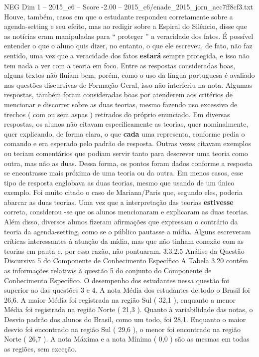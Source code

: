\begin{textsample}{NEG Dim 1 – 2015\_c6 – Score -2.00 – 2015\_c6/enade\_2015\_jorn\_aec7ff8cf3.txt}
Houve, também, casos em que o estudante respondeu corretamente sobre a agenda-setting e seu efeito, mas ao redigir sobre a Espiral do Silêncio, disse que as notícias eram manipuladas para “ proteger ” a veracidade dos fatos.
É possível entender o que o aluno quis dizer, no entanto, o que ele escreveu, de fato, não faz sentido, uma vez que a veracidade dos fatos \textbf{estará} sempre protegida, e isso não tem nada a ver com a teoria em foco.
Entre as respostas consideradas boas, alguns textos não fluíam bem, porém, como o uso da língua portuguesa é avaliado nas questões discursivas de Formação Geral, isso não interferiu na nota.
Algumas respostas, também foram consideradas boas por atenderem aos critérios de mencionar e discorrer sobre as duas teorias, mesmo fazendo uso excessivo de trechos ( com ou sem aspas ) retirados do próprio enunciado.
Em diversas respostas, os alunos não citavam especificamente as teorias, quer nominalmente, quer explicando, de forma clara, o que \textbf{cada} uma representa, conforme pedia o comando e era esperado pelo padrão de resposta.
Outras vezes citavam exemplos ou teciam comentários que podiam servir tanto para descrever uma teoria como outra, mas não as duas.
Dessa forma, os pontos foram dados conforme a resposta se encontrasse mais próxima de uma teoria ou da outra.
Em menos casos, esse tipo de resposta englobava as duas teorias, mesmo que usando de um único exemplo.
Foi muito citado o caso de Mariana/Paris que, segundo eles, poderia abarcar as duas teorias.
Uma vez que a interpretação das teorias \textbf{estivesse} correta, considerou -se que os alunos mencionaram e explicaram as duas teorias.
Além disso, diversos alunos fizeram afirmações que expressam o contrário da teoria da agenda-setting, como se o público pautasse a mídia.
Alguns escreveram críticas interessantes à atuação da mídia, mas que não tinham conexão com as teorias em pauta e, por essa razão, não pontuaram. 3.3.2.5 Análise da Questão Discursiva 5 do Componente de Conhecimento Específico A Tabela 3.20 contém as informações relativas à questão 5 do conjunto do Componente de Conhecimento Específico.
O desempenho dos estudantes nessa questão foi superior ao das questões 3 e 4.
A nota Média dos estudantes de todo o Brasil foi 26,6.
A maior Média foi registrada na região Sul ( 32,1 ), enquanto a menor Média foi registrada na região Norte ( 21,3 ).
Quanto à variabilidade das notas, o Desvio padrão dos alunos do Brasil, como um todo, foi 28,1.
Enquanto o maior desvio foi encontrado na região Sul ( 29,6 ), o menor foi encontrado na região Norte ( 26,7 ).
A nota Máxima e a nota Mínima ( 0,0 ) são as mesmas em todas as regiões, sem exceção.

\end{textsample}
